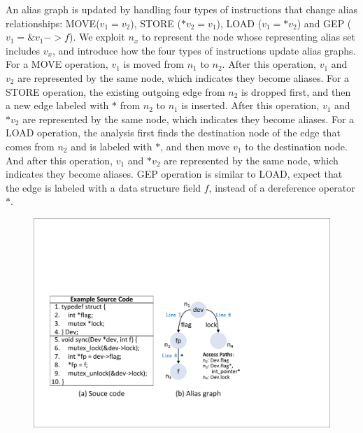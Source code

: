 An alias graph is updated by handling four types of instructions that  
change alias relationships: MOVE($\mathit{v_1 = v_2}$), STORE ($\mathit{*v_2 = 
v_1}$), LOAD ($\mathit{v_1 = *v_2}$) and GEP ({$\mathit{v_1 = \&v_1->f}$}). We 
exploit {$\mathit{n_x}$} to represent the node whose representing alias set 
includes $\mathit{v_x}$, and introduce how the four types of instructions 
update alias graphs. For a MOVE operation, $\mathit{v_1}$ is moved from 
$\mathit{n_1}$ to $\mathit{n_2}$. After this operation, $\mathit{v_1}$ and  
$\mathit{v_2}$ are represented by the same node, which indicates they become 
aliases. For a STORE operation, the existing outgoing edge from $\mathit{n_2}$ 
is dropped first, and then a new edge labeled with $\mathit{*}$ from 
$\mathit{n_2}$ to $\mathit{n_1}$ is inserted. After this operation, 
$\mathit{v_1}$ and $\mathit{*v_2}$ are represented by the same node, which 
indicates they become aliases. For a LOAD operation, the analysis first finds 
the destination node of the edge that comes from $\mathit{n_2}$ and is labeled 
with $\mathit{*}$, and then move $\mathit{v_1}$ to the destination node. And 
after this operation, $\mathit{v_1}$ and $\mathit{*v_2}$ are represented by the 
same node, which indicates they become aliases. GEP operation is similar to 
LOAD, expect that the edge is labeled with a data structure field $\mathit{f}$, 
instead of a dereference operator $\mathit{*}$.

\begin{figure}[htbp]
	\centering
	\includegraphics[width=0.9\linewidth]{figures/fig_demo_alias_graph.pdf}
	\label{fig_demo_alias_graph}
\end{figure}


